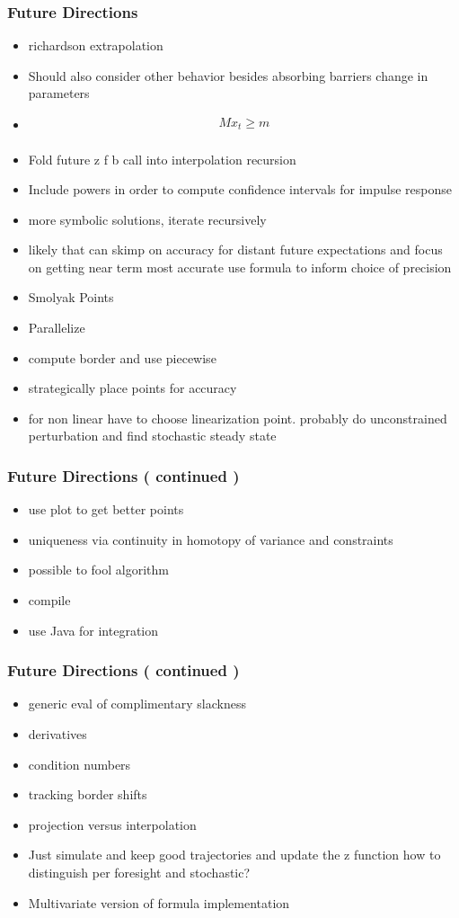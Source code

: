\documentclass{beamer}
\begin{document}
   \begin{frame}
     \frametitle{Future Directions}
     \begin{itemize}
     \item richardson extrapolation
     \item Should also consider other behavior besides absorbing barriers change in parameters
     \item  \begin{gather*}
 M x_t \ge m \\
 \end{gather*}
\item Fold future z f b call into interpolation recursion
\item Include  powers in order to compute confidence intervals for impulse response
\item  more symbolic solutions, iterate recursively
\item likely that can skimp on accuracy for distant future expectations and focus on getting near term most accurate use formula to inform choice of precision
\item  Smolyak Points 
\item Parallelize
\item compute border and use piecewise
\item strategically place points for accuracy
  \item for non linear have to choose linearization point.  probably do unconstrained perturbation and find stochastic steady state
     \end{itemize}
   \end{frame}
   \begin{frame}
     \frametitle{Future Directions ( continued )}
     \begin{itemize}
\item use plot to get better points
\item uniqueness via continuity in homotopy of variance and constraints
\item possible to fool algorithm
\item compile
\item  use Java for integration
     \end{itemize}
   \end{frame}
   \begin{frame}
     \frametitle{Future Directions ( continued )}
     \begin{itemize}
\item generic eval of complimentary slackness
\item derivatives
\item condition numbers
\item tracking border shifts
\item projection versus interpolation
\item Just simulate and keep good trajectories and update the z function how to distinguish per foresight and stochastic?
\item Multivariate version of formula implementation
     \end{itemize}
   \end{frame}
\end{document}
